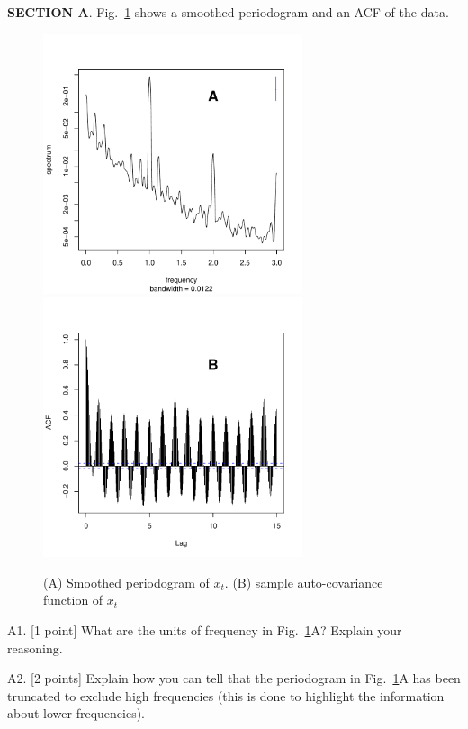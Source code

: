 \documentclass[12pt]{article}
\def\qskip{\vspace{1.5in}}
\begin{document}
{\bf SECTION A}. Fig.~\ref{fig:summary} shows a smoothed periodogram and an ACF of the data.
\begin{figure}
\vspace{-1cm}
\includegraphics[width=3in,height=3in]{ER-um-spec-closeup}
\includegraphics[width=3in,height=3in]{ER-um-acf}
\vspace{-0.5cm}
\caption{(A) Smoothed periodogram of $x_t$. (B) sample auto-covariance function of $x_t$}\label{fig:summary}
\end{figure}

A1. [1 point] What are the units of frequency in Fig.~\ref{fig:summary}A? 
Explain your reasoning.
\qskip

A2. [2 points] Explain how you can tell that the periodogram in Fig.~\ref{fig:summary}A has been truncated to exclude high frequencies (this is done to highlight the information about lower frequencies).

\qskip

\newpage

\end{document}
